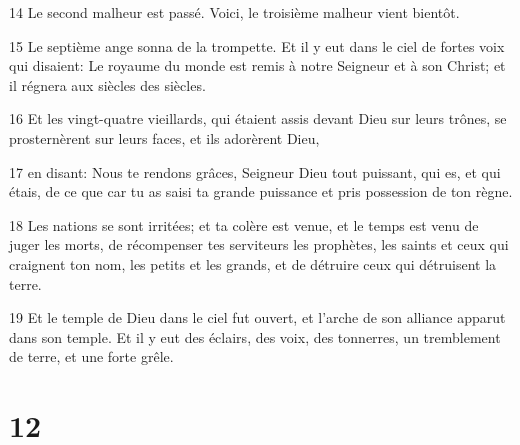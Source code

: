 \par 14 Le second malheur est passé. Voici, le troisième malheur vient bientôt.
\par 15 Le septième ange sonna de la trompette. Et il y eut dans le ciel de fortes voix qui disaient: Le royaume du monde est remis à notre Seigneur et à son Christ; et il régnera aux siècles des siècles.
\par 16 Et les vingt-quatre vieillards, qui étaient assis devant Dieu sur leurs trônes, se prosternèrent sur leurs faces, et ils adorèrent Dieu,
\par 17 en disant: Nous te rendons grâces, Seigneur Dieu tout puissant, qui es, et qui étais, de ce que car tu as saisi ta grande puissance et pris possession de ton règne.
\par 18 Les nations se sont irritées; et ta colère est venue, et le temps est venu de juger les morts, de récompenser tes serviteurs les prophètes, les saints et ceux qui craignent ton nom, les petits et les grands, et de détruire ceux qui détruisent la terre.
\par 19 Et le temple de Dieu dans le ciel fut ouvert, et l'arche de son alliance apparut dans son temple. Et il y eut des éclairs, des voix, des tonnerres, un tremblement de terre, et une forte grêle.

\chapter{12}


